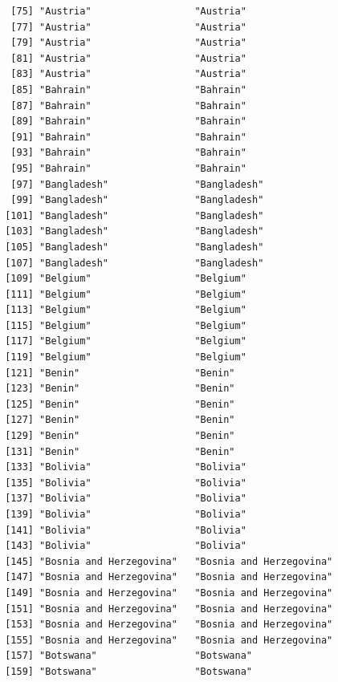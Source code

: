 \documentclass[
  letterpaper,
  DIV=11,
  numbers=noendperiod]{scrreprt}
\begin{document}
\begin{verbatim}
  [75] "Austria"                  "Austria"                 
  [77] "Austria"                  "Austria"                 
  [79] "Austria"                  "Austria"                 
  [81] "Austria"                  "Austria"                 
  [83] "Austria"                  "Austria"                 
  [85] "Bahrain"                  "Bahrain"                 
  [87] "Bahrain"                  "Bahrain"                 
  [89] "Bahrain"                  "Bahrain"                 
  [91] "Bahrain"                  "Bahrain"                 
  [93] "Bahrain"                  "Bahrain"                 
  [95] "Bahrain"                  "Bahrain"                 
  [97] "Bangladesh"               "Bangladesh"              
  [99] "Bangladesh"               "Bangladesh"              
 [101] "Bangladesh"               "Bangladesh"              
 [103] "Bangladesh"               "Bangladesh"              
 [105] "Bangladesh"               "Bangladesh"              
 [107] "Bangladesh"               "Bangladesh"              
 [109] "Belgium"                  "Belgium"                 
 [111] "Belgium"                  "Belgium"                 
 [113] "Belgium"                  "Belgium"                 
 [115] "Belgium"                  "Belgium"                 
 [117] "Belgium"                  "Belgium"                 
 [119] "Belgium"                  "Belgium"                 
 [121] "Benin"                    "Benin"                   
 [123] "Benin"                    "Benin"                   
 [125] "Benin"                    "Benin"                   
 [127] "Benin"                    "Benin"                   
 [129] "Benin"                    "Benin"                   
 [131] "Benin"                    "Benin"                   
 [133] "Bolivia"                  "Bolivia"                 
 [135] "Bolivia"                  "Bolivia"                 
 [137] "Bolivia"                  "Bolivia"                 
 [139] "Bolivia"                  "Bolivia"                 
 [141] "Bolivia"                  "Bolivia"                 
 [143] "Bolivia"                  "Bolivia"                 
 [145] "Bosnia and Herzegovina"   "Bosnia and Herzegovina"  
 [147] "Bosnia and Herzegovina"   "Bosnia and Herzegovina"  
 [149] "Bosnia and Herzegovina"   "Bosnia and Herzegovina"  
 [151] "Bosnia and Herzegovina"   "Bosnia and Herzegovina"  
 [153] "Bosnia and Herzegovina"   "Bosnia and Herzegovina"  
 [155] "Bosnia and Herzegovina"   "Bosnia and Herzegovina"  
 [157] "Botswana"                 "Botswana"                
 [159] "Botswana"                 "Botswana"                

\end{verbatim}
\end{document}
